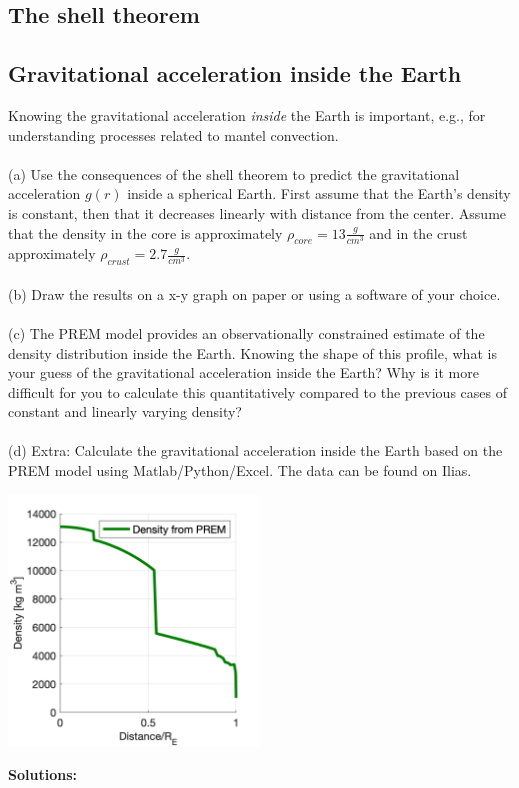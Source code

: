 \documentclass[a4paper,12pt]{article}
\newif\ifanswers
\begin{document}
\subsection{The shell theorem}
\label{Sec:Shell{}}
\pagebreak
\subsection{Gravitational acceleration inside the Earth}
Knowing the gravitational acceleration \textit{inside} the Earth is important, e.g., for understanding processes related to mantel convection. \\
\\
\noindent (a) Use the consequences of the shell theorem to predict the gravitational acceleration $g(r)$ inside a spherical Earth. First assume that the Earth's density is constant, then that it decreases linearly with distance from the center. Assume that the density in the core is approximately $\rho_{core} = 13 \frac{g}{cm^3}$ and in the crust approximately $\rho_{crust} = 2.7 \frac{g}{cm^3}$.\\
\\
\noindent (b) Draw the results on a x-y graph on paper or using a software of your choice.\\
\\
\noindent (c) The PREM model provides an observationally constrained estimate of the density distribution inside the Earth. Knowing the shape of this profile, what is your guess of the gravitational acceleration inside the Earth? Why is it more difficult for you to calculate this quantitatively compared to the previous cases of constant and linearly varying density?\\
\\
\noindent (d) Extra: Calculate the gravitational acceleration inside the Earth based on the PREM model using Matlab/Python/Excel. The data can be found on Ilias.
\begin{center}
    \includegraphics[width=0.5\textwidth]{Figures/Gravimetry/Gravimetry01_PREM.png}
 \end{center}
\ifanswers
    \noindent \textbf{Solutions:}
\end{document}
